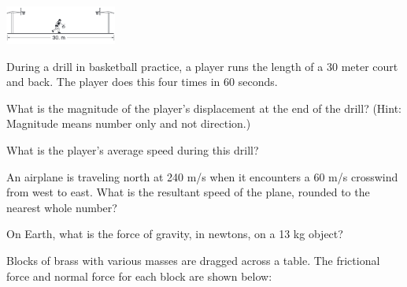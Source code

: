 \documentclass[10pt]{examdesign}
\begin{document}
\begin{multiplechoice} [title={Multiple Choice},
	rearrange=yes]
\begin{block}
	\includegraphics[height=0.5in]{bball.png} 
	
	During a drill in basketball practice, a player runs the length of a 30 meter court and back.  The player does this four times in 60 seconds. 
	
	\begin{question}
		What is the magnitude of the player's displacement at the end of the drill? (Hint: Magnitude means number only and not direction.)
	
	\end{question}
	
	
	\begin{question}
		What is the player's average speed during this drill? 

	\end{question}
\end{block}

\begin{question}
	An airplane is traveling north at 240 m/s when it encounters a 60 m/s crosswind from west to east.  What is the resultant speed of the plane, rounded to the nearest whole number? 

\end{question}



\begin{question}
	On Earth, what is the force of gravity, in newtons, on a 13 kg object?

	
\end{question}





\begin{question}
	Blocks of brass with various masses are dragged across a table.  The frictional force and normal force for each block are shown below: 
	
\end{question}
\end{multiplechoice}
\end{document}
